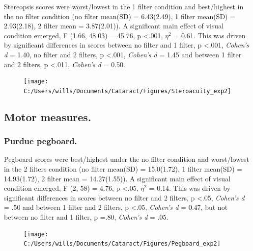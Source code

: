 \documentclass[
  english,
  man,floatsintext]{apa6}
\begin{document}
Stereopsis scores were worst/lowest in the 1 filter condition and best/highest in the no filter condition (no filter mean(SD) = 6.43(2.49), 1 filter mean(SD) = 2.93(2.18), 2 filter mean = 3.87(2.01)).
A significant main effect of visual condition emerged, F (1.66, 48.03) = 45.76, p \textless{}.001, \(\eta^2\) = 0.61.
This was driven by significant differences in scores between no filter and 1 filter, p \textless{}.001, \emph{Cohen's d} = 1.40, no filter and 2 filters, p \textless{}.001, \emph{Cohen's d} = 1.45 and between 1 filter and 2 filters, p \textless{}.011, \emph{Cohen's d} = 0.50.

\begin{figure}

{\centering \texttt{[image: C:/Users/wills/Documents/Cataract/Figures/Steroacuity\_exp2]} 

}

\caption{ }\label{fig:unnamed-chunk-7}
\end{figure}

\hypertarget{motor-measures.}{%
\subsection{Motor measures.}\label{motor-measures.}}

\hypertarget{purdue-pegboard.}{%
\subsubsection{Purdue pegboard.}\label{purdue-pegboard.}}

Pegboard scores were best/highest under the no filter condition and worst/lowest in the 2 filters condition (no filter mean(SD) = 15.0(1.72), 1 filter mean(SD) = 14.93(1.72), 2 filter mean = 14.27(1.55)).
A significant main effect of visual condition emerged, F (2, 58) = 4.76, p \textless{}.05, \(\eta^2\) = 0.14.
This was driven by significant differences in scores between no filter and 2 filters, p \textless{}.05, \emph{Cohen's d} = .50 and between 1 filter and 2 filters, p \textless{}.05, \emph{Cohen's d} = 0.47, but not between no filter and 1 filter, p =.80, \emph{Cohen's d} = .05.

\begin{figure}

{\centering \texttt{[image: C:/Users/wills/Documents/Cataract/Figures/Pegboard\_exp2]} 

}

\caption{ }\label{fig:unnamed-chunk-8}
\end{figure}
\end{document}

